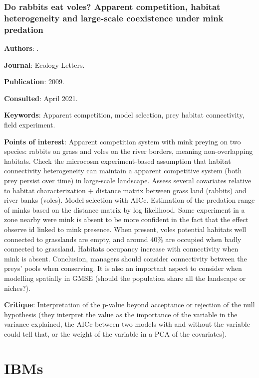\documentclass[12pt,a4paper]{article}
\begin{document}
\newpage

\subsubsection*{Do rabbits eat voles? Apparent competition, habitat heterogeneity and large-scale coexistence under mink predation}

\textbf{Authors}: \cite{oliver2009rabbits}.

\textbf{Journal}: Ecology Letters.

\textbf{Publication}: 2009.

\textbf{Consulted}: April 2021.

\textbf{Keywords}: Apparent competition, model selection, prey habitat connectivity, field experiment.

\textbf{Points of interest}: Apparent competition system with mink preying on two species: rabbits on grass and voles on the river borders, meaning non-overlapping habitats. Check the microcosm experiment-based assumption that habitat connectivity heterogeneity can maintain a apparent competitive system (both prey persist over time) in large-scale landscape. Assess several covariates relative to habitat characterization + distance matrix between grass land (rabbits) and river banks (voles). Model selection with AICc. Estimation of the predation range of minks based on the distance matrix by log likelihood. Same experiment in a zone nearby were mink is absent to be more confident in the fact that the effect observe id linked to mink presence. When present, voles potential habitats well connected to grasslands are empty, and around 40\% are occupied when badly connected to grassland. Habitats occupancy increase with connectivity when mink is absent. Conclusion, managers should consider connectivity between the preys' pools when conserving. It is also an important aspect to consider when modelling spatially in GMSE (should the population share all the landscape or niches?).

\textbf{Critique}: Interpretation of the p-value beyond acceptance or rejection of the null hypothesis (they interpret the value as the importance of the variable in the variance explained, the AICc between two models with and without the variable could tell that, or the weight of the variable in a PCA of the covariates).

\newpage

\section*{IBMs}
\end{document}
